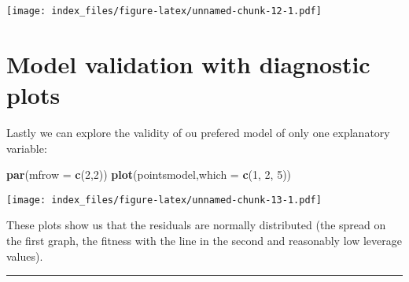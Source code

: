 \documentclass[]{article}
\newenvironment{Shaded}{\begin{snugshade}}{\end{snugshade}}
\newcommand{\KeywordTok}[1]{\textcolor[rgb]{0.13,0.29,0.53}{\textbf{#1}}}
\newcommand{\DataTypeTok}[1]{\textcolor[rgb]{0.13,0.29,0.53}{#1}}
\newcommand{\DecValTok}[1]{\textcolor[rgb]{0.00,0.00,0.81}{#1}}
\newcommand{\NormalTok}[1]{#1}
\begin{document}
\texttt{[image: index\_files/figure-latex/unnamed-chunk-12-1.pdf]}

\section{Model validation with diagnostic
plots}\label{model-validation-with-diagnostic-plots}

Lastly we can explore the validity of ou prefered model of only one
explanatory variable:

\begin{Shaded}
\begin{Highlighting}[]
\KeywordTok{par}\NormalTok{(}\DataTypeTok{mfrow =} \KeywordTok{c}\NormalTok{(}\DecValTok{2}\NormalTok{,}\DecValTok{2}\NormalTok{))}
\KeywordTok{plot}\NormalTok{(pointsmodel,}\DataTypeTok{which =} \KeywordTok{c}\NormalTok{(}\DecValTok{1}\NormalTok{, }\DecValTok{2}\NormalTok{, }\DecValTok{5}\NormalTok{))}
\end{Highlighting}
\end{Shaded}

\texttt{[image: index\_files/figure-latex/unnamed-chunk-13-1.pdf]}

These plots show us that the residuals are normally distributed (the
spread on the first graph, the fitness with the line in the second and
reasonably low leverage values).

\begin{center}\rule{0.5\linewidth}{\linethickness}\end{center}
\end{document}
